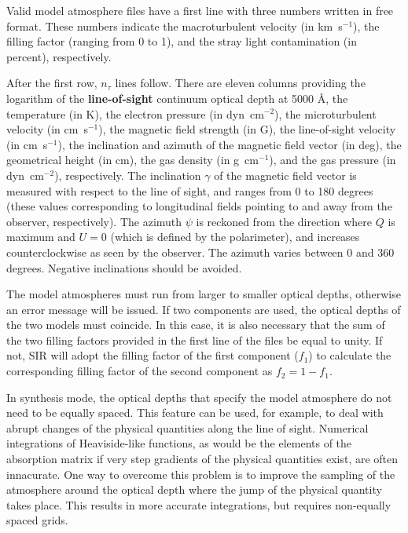 Valid model atmosphere files have a first line with three numbers
written in free format. These numbers indicate the macroturbulent
velocity (in km~s$^{-1}$), the filling factor (ranging from 0 to 1),
and the stray light contamination (in percent), respectively.

After the first row, $n_\tau$ lines follow. There are eleven columns 
providing the logarithm of the {\bf line-of-sight} continuum 
optical depth at 5000 \AA\/, the temperature (in K), the 
electron pressure (in dyn~cm$^{-2}$), the microturbulent velocity (in
cm~s$^{-1}$), the magnetic field strength (in G), the line-of-sight
velocity (in cm~s$^{-1}$), the inclination and azimuth of the
magnetic field vector (in deg), the geometrical height (in cm), the 
gas density (in g~cm$^{-1}$), and the gas pressure (in dyn~cm$^{-2}$), 
respectively. The inclination $\gamma$ of the magnetic field vector is 
measured with respect to the line of sight, and ranges from 0 to 180 
degrees (these values corresponding to longitudinal fields pointing to
and away from the observer, respectively). The azimuth 
$\psi$ is reckoned from the direction where $Q$ is maximum and $U=0$ 
(which is defined by the polarimeter), and increases counterclockwise 
as seen by the observer. The azimuth varies between 0 and 360 degrees.  
Negative inclinations should be avoided. 

The model atmospheres must run from larger to smaller optical depths,
otherwise an error message will be issued. If two components are 
used, the optical depths of the two models must coincide. In this
case, it is also necessary that the sum of the two filling factors
provided in the first line of the files be equal to unity. If not, SIR
will adopt the filling factor of the first component ($f_1$) to 
calculate the corresponding filling factor of the second component
as $f_2 = 1 - f_1$.

In synthesis mode, the optical depths that specify the model atmosphere
do not need to be equally spaced. This feature can be used, for
example, to deal with abrupt changes of the physical quantities along
the line of sight. Numerical integrations of Heaviside-like functions, 
as would be the elements of the absorption matrix if very step
gradients of the physical quantities exist, are often innacurate. One
way to overcome this problem is to improve the sampling of the
atmosphere around the optical depth where the jump of the physical
quantity takes place. This results in more accurate integrations, but
requires non-equally spaced grids.

